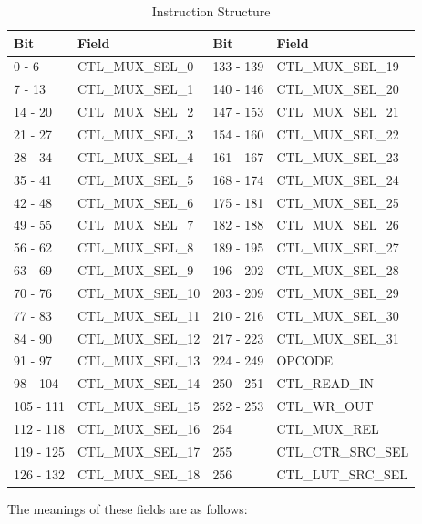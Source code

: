 \documentclass[main\_\_EN.tex]{subfiles}
\begin{document}
\begin{table}[H]
\centering
\caption{Instruction Structure}
\label{tab:bitscrm-instruction-struct}
\begin{tabular}{ | l | l || l| l | }
\hline\rowcolor{lightgray}
Bit & Field & Bit & Field \\
\hline
0 - 6 & CTL\_MUX\_SEL\_0 & 133 - 139 & CTL\_MUX\_SEL\_19 \\ \hline
7 - 13 & CTL\_MUX\_SEL\_1 & 140 - 146 & CTL\_MUX\_SEL\_20 \\ \hline
14 - 20 & CTL\_MUX\_SEL\_2 & 147 - 153 & CTL\_MUX\_SEL\_21 \\ \hline
21 - 27 & CTL\_MUX\_SEL\_3 & 154 - 160 & CTL\_MUX\_SEL\_22 \\ \hline
28 - 34 & CTL\_MUX\_SEL\_4 & 161 - 167 & CTL\_MUX\_SEL\_23 \\ \hline
35 - 41 & CTL\_MUX\_SEL\_5 & 168 - 174 & CTL\_MUX\_SEL\_24 \\ \hline
42 - 48 & CTL\_MUX\_SEL\_6 & 175 - 181 & CTL\_MUX\_SEL\_25 \\ \hline
49 - 55 & CTL\_MUX\_SEL\_7 & 182 - 188 & CTL\_MUX\_SEL\_26 \\ \hline
56 - 62 & CTL\_MUX\_SEL\_8 & 189 - 195 & CTL\_MUX\_SEL\_27 \\ \hline
63 - 69 & CTL\_MUX\_SEL\_9 & 196 - 202 & CTL\_MUX\_SEL\_28 \\ \hline
70 - 76 & CTL\_MUX\_SEL\_10 & 203 - 209 & CTL\_MUX\_SEL\_29 \\ \hline
77 - 83 & CTL\_MUX\_SEL\_11 & 210 - 216 & CTL\_MUX\_SEL\_30 \\ \hline
84 - 90 & CTL\_MUX\_SEL\_12 & 217 - 223 & CTL\_MUX\_SEL\_31 \\ \hline
91 - 97 & CTL\_MUX\_SEL\_13 & 224 - 249 & OPCODE \\ \hline
98 - 104 & CTL\_MUX\_SEL\_14 & 250 - 251 & CTL\_READ\_IN \\ \hline
105 - 111 & CTL\_MUX\_SEL\_15 & 252 - 253 & CTL\_WR\_OUT \\ \hline
112 - 118 & CTL\_MUX\_SEL\_16 & 254 & CTL\_MUX\_REL \\ \hline
119 - 125 & CTL\_MUX\_SEL\_17 & 255 & CTL\_CTR\_SRC\_SEL \\ \hline
126 - 132 & CTL\_MUX\_SEL\_18 & 256 & CTL\_LUT\_SRC\_SEL \\
\hline
\end{tabular}
\end{table}


The meanings of these fields are as follows:
\end{document}
